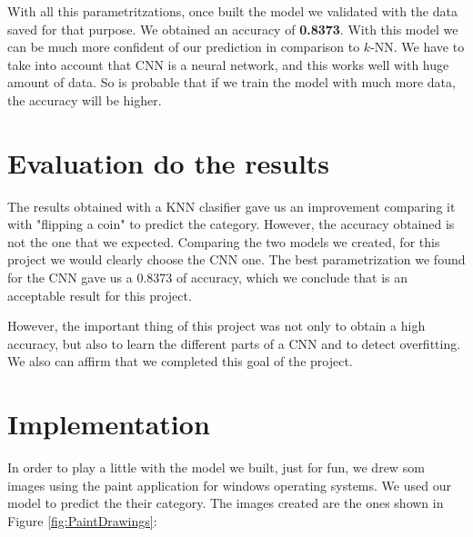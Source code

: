 \documentclass{article}
\begin{document}
With all this parametritzations, once built the model we validated with the data saved for that purpose. We obtained an accuracy of \textbf{0.8373}. With this model we can be much more confident of our prediction in comparison to $k$-NN. We have to take into account that CNN is a neural network, and this works well with huge amount of data. So is probable that if we train the model with much more data, the accuracy will be higher.

\section{Evaluation do the results}

The results obtained with a KNN clasifier gave us an improvement comparing it with "flipping a coin" to predict the category. However, the accuracy obtained is not the one that we expected.  Comparing the two models we created, for this project we would clearly choose the CNN one. The best parametrization we found for the CNN gave us a 0.8373 of accuracy, which we conclude that is an acceptable result for this project. 

However, the important thing of this project was not only to obtain a high accuracy, but also to learn the different parts of a CNN and to detect overfitting. We also can affirm that we completed this goal of the project.

\section{Implementation}
In order to play a little with the model we built, just for fun, we drew som images using the paint application for windows operating systems. We used our model to predict the their category. The images created are the ones shown in Figure \ref{fig:PaintDrawings}:
\end{document}
